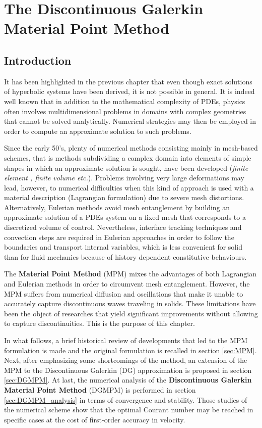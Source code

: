 \chapter{The Discontinuous Galerkin Material Point Method}

\section*{Introduction}
It has been highlighted in the previous chapter that even though exact solutions of hyperbolic systems have been derived, it is not possible in general. It is indeed well known that in addition to the mathematical complexity of PDEs, physics often involves multidimensional problems in domains with complex geometries that cannot be solved analytically. Numerical strategies may then be employed in order to compute an approximate solution to such problems.

Since the early 50's, plenty of numerical methods consisting mainly in mesh-based schemes, that is methods subdividing a complex domain into elements of simple shapes in which an approximate solution is sought, have been developed (\textit{finite element \cite{Belytschko}, finite volume \cite{Leveque} etc.}). Problems involving very large deformations may lead, however, to numerical difficulties when this kind of approach is used with a material description (Lagrangian formulation) due to severe mesh distortions. Alternatively, Eulerian methods avoid mesh entanglement by building an approximate solution of a PDEs system on a fixed mesh that corresponds to a discretized volume of control. Nevertheless, interface tracking techniques and convection steps are required in Eulerian approaches in order to follow the boundaries and transport internal variables, which is less convenient for solid than for fluid mechanics because of history dependent constitutive behaviours.

The \textbf{Material Point Method} (MPM) \cite{Sulsky94} mixes the advantages of both Lagrangian and Eulerian methods in order to circumvent mesh entanglement. However, the MPM suffers from numerical diffusion and oscillations that make it unable to accurately capture discontinuous waves traveling in solids. These limitations have been the object of researches that yield significant improvements without allowing to capture discontinuities. This is the purpose of this chapter.

In what follows, a brief historical review of developments that led to the MPM formulation is made and the original formulation is recalled in section \ref{sec:MPM}. Next, after emphasizing some shortcomings of the method, an extension of the MPM to the Discontinuous Galerkin (DG) approximation is proposed in section \ref{sec:DGMPM}. At last, the numerical analysis of the \textbf{Discontinuous Galerkin Material Point Method} (DGMPM) is performed in section \ref{sec:DGMPM_analysis} in terms of convergence and stability. Those studies of the numerical scheme show that the optimal Courant number may be reached in specific cases at the cost of first-order accuracy in velocity.



